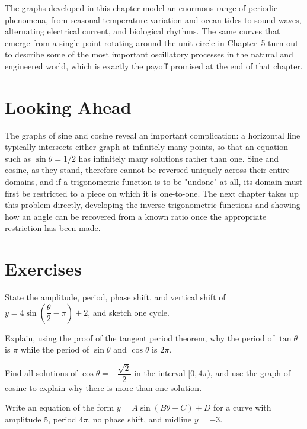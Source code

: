 The graphs developed in this chapter model an enormous range of periodic
phenomena, from seasonal temperature variation and ocean tides to sound
waves, alternating electrical current, and biological rhythms. The same
curves that emerge from a single point rotating around the unit circle in
Chapter~5 turn out to describe some of the most important oscillatory
processes in the natural and engineered world, which is exactly the payoff
promised at the end of that chapter.

\section{Looking Ahead}

The graphs of sine and cosine reveal an important complication: a
horizontal line typically intersects either graph at infinitely many
points, so that an equation such as $\sin\theta = 1/2$ has infinitely many
solutions rather than one. Sine and cosine, as they stand, therefore cannot
be reversed uniquely across their entire domains, and if a trigonometric
function is to be "undone" at all, its domain must first be restricted to a
piece on which it is one-to-one. The next chapter takes up this problem
directly, developing the inverse trigonometric functions and showing how an
angle can be recovered from a known ratio once the appropriate restriction
has been made.

\section{Exercises}
\begin{exercise}
State the amplitude, period, phase shift, and vertical shift of
$y = 4\sin\left(\dfrac{\theta}{2} - \pi\right) + 2$, and sketch one cycle.
\end{exercise}

\begin{exercise}
Explain, using the proof of the tangent period theorem, why the period of
$\tan\theta$ is $\pi$ while the period of $\sin\theta$ and $\cos\theta$ is
$2\pi$.
\end{exercise}

\begin{exercise}
Find all solutions of $\cos\theta = -\dfrac{\sqrt2}{2}$ in the interval
$[0, 4\pi)$, and use the graph of cosine to explain why there is more than
one solution.
\end{exercise}

\begin{exercise}
Write an equation of the form $y = A\sin(B\theta - C) + D$ for a curve with
amplitude $5$, period $4\pi$, no phase shift, and midline $y = -3$.
\end{exercise}
